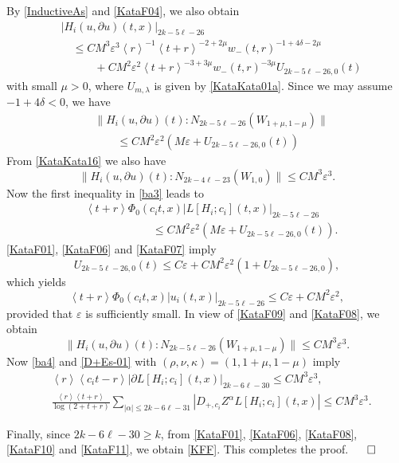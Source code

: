 \documentclass[12pt]{amsart}
\newcommand{\ve}{\varepsilon}
\newcommand{\pa}{\partial}
\newcommand{\jb}[1]{\left\langle #1 \right\rangle}
\newcommand{\norm}[2]{\|#1 \!:\! #2\|}
\numberwithin{equation}{section}
\begin{document}
By \eqref{InductiveAs} and \eqref{KataF04}, we also obtain
\begin{align}
& |H_i(u,\pa u)(t,x)|_{2k-5\ell-26}\\
& \quad \le 
CM^3\ve^3 \jb{r}^{-1} \jb{t+r}^{-2+2\mu}
w_-(t,r)^{-1+4\delta-2\mu}
\nonumber\\
&\quad \qquad {}+CM^2\ve^2\jb{t+r}^{-3+3\mu}
w_-(t,r)^{-3\mu}
U_{2k-5\ell-26, 0}(t)
\nonumber
\end{align}
with small $\mu>0$,
where $U_{m, \lambda}$ is given by \eqref{KataKata01a}.
Since we may assume $-1+4\delta<0$, we have
\begin{align}
\label{KataF09}
& \norm{H_i(u, \pa u)(t)}{N_{2k-5\ell-26}(W_{1+\mu, 1-\mu})} \\
& \qquad \le CM^2\ve^2(M\ve+U_{2k-5\ell-26,0}(t))
\nonumber
\end{align}
From \eqref{KataKata16} we also have
\begin{equation}
\norm{H_i(u, \pa u)(t)}{N_{2k-4\ell-23}(W_{1, 0})} 
\le CM^3\ve^3.
\end{equation}
Now the first inequality in \eqref{ba3} leads to
\begin{align}
\label{KataF07} 
& \jb{t+r}\Phi_0(c_it, x)|L[H_i; c_i](t,x)|_{2k-5\ell-26}\\
& \qquad\qquad\qquad \le
CM^2\ve^2(M\ve+U_{2k-5\ell-26,0}(t)).
\nonumber
\end{align}
\eqref{KataF01}, \eqref{KataF06} and \eqref{KataF07} imply
$$
U_{2k-5\ell-26,0}(t)\le C\ve+CM^2\ve^2(1+U_{2k-5\ell-26,0}),
$$
which yields
\begin{equation}
\label{KataF08}
 \jb{t+r}\Phi_0(c_it, x)|u_i(t,x)|_{2k-5\ell-26}
 \le C\ve+CM^2\ve^2,
\end{equation}
provided that $\ve$ is sufficiently small.
In view of \eqref{KataF09} and \eqref{KataF08},
we obtain
$$
 \norm{H_i(u, \pa u)(t)}{N_{2k-5\ell-26}(W_{1+\mu, 1-\mu})} 
 \le CM^3\ve^3.
$$
Now \eqref{ba4} and \eqref{D+Es-01} with $(\rho, \nu, \kappa)=(1, 1+\mu, 1-\mu)$ 
imply
\begin{align}
\label{KataF10}
& \jb{r}\jb{c_it-r}|\pa L[H_i; c_i](t,x)|_{2k-6\ell-30}\le CM^3\ve^3,\\
\label{KataF11}
& \frac{\jb{r}\jb{t+r}}{\log(2+t+r)}\sum_{|\alpha|\le 2k-6\ell-31}
|D_{+, c_i}Z^\alpha L[H_i; c_i](t,x)|\le CM^3\ve^3.
\end{align}

Finally, since $2k-6\ell-30\ge k$,
from \eqref{KataF01}, \eqref{KataF06}, \eqref{KataF08},
\eqref{KataF10} and \eqref{KataF11}, we obtain 
\eqref{KFF}.
This completes the proof.
\hfill$\qed$
\end{document}
